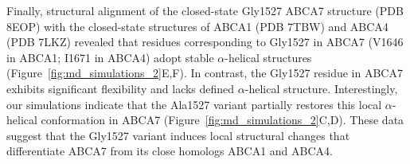 \quoteO

Finally, structural alignment of the closed-state Gly1527 ABCA7 structure (PDB 8EOP) with the closed-state structures of ABCA1 (PDB 7TBW) and ABCA4 (PDB 7LKZ) revealed that residues corresponding to Gly1527 in ABCA7 (V1646 in ABCA1; I1671 in ABCA4) adopt stable $\alpha$-helical structures (Figure~\ref{fig:md_simulations_2}E,F). In contrast, the Gly1527 residue in ABCA7 exhibits significant flexibility and lacks defined $\alpha$-helical structure. Interestingly, our simulations indicate that the Ala1527 variant partially restores this local $\alpha$-helical conformation in ABCA7 (Figure~\ref{fig:md_simulations_2}C,D). These data suggest that the Gly1527 variant induces local structural changes that differentiate ABCA7 from its close homologs ABCA1 and ABCA4.
